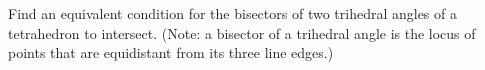 Find an equivalent condition for the bisectors of two trihedral angles of a tetrahedron to intersect.\newline
(Note: a bisector of a trihedral angle is the locus of points
that are equidistant from its three line edges.)
